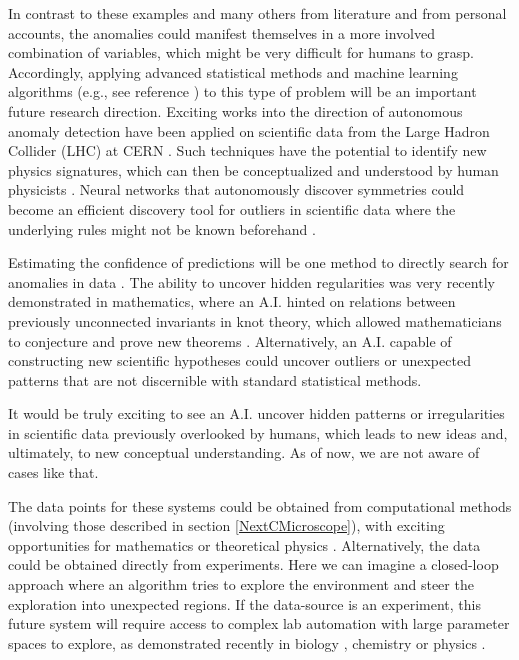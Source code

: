 In contrast to these examples and many others from literature and from personal accounts, the anomalies could manifest themselves in a more involved combination of variables, which might be very difficult for humans to grasp. Accordingly, applying advanced statistical methods and machine learning algorithms (e.g., see reference \cite{malhotra2015long}) to this type of problem will be an important future research direction. Exciting works into the direction of autonomous anomaly detection have been applied on scientific data from the Large Hadron Collider (LHC) at CERN \cite{aad2020dijet, tonon2021probing, park2021quasi}. Such techniques have the potential to identify new physics signatures, which can then be conceptualized and understood by human physicists \cite{schwartz2021modern,kasieczka2021lhc}. Neural networks that autonomously discover symmetries could become an efficient discovery tool for outliers in scientific data where the underlying rules might not be known beforehand \cite{yu2018group,dehmamy2021automatic}.

Estimating the confidence of predictions will be one method to directly search for anomalies in data \cite{nigam2021assigning}. The ability to uncover hidden regularities was very recently demonstrated in mathematics, where an A.I. hinted on relations between previously unconnected invariants in knot theory, which allowed mathematicians to conjecture and prove new theorems \cite{davies2021advancing}. Alternatively, an A.I. capable of constructing new scientific hypotheses could uncover outliers or unexpected patterns that are not discernible with standard statistical methods.

It would be truly exciting to see an A.I. uncover hidden patterns or irregularities in scientific data previously overlooked by humans, which leads to new ideas and, ultimately, to new conceptual understanding. As of now, we are not aware of cases like that.


The data points for these systems could be obtained from computational methods (involving those described in section \ref{NextCMicroscope}), with exciting opportunities for mathematics or theoretical physics \cite{douglas2022machine}. Alternatively, the data could be obtained directly from experiments. Here we can imagine a closed-loop approach where an algorithm tries to explore the environment and steer the exploration into unexpected regions. If the data-source is an experiment, this future system will require access to complex lab automation with large parameter spaces to explore, as demonstrated recently in biology \cite{king2009automation}, chemistry \cite{bedard2018reconfigurable, steiner2019organic, coley2019robotic, burger2020mobile, chatterjee2020automated, grizou2020curious} or physics \cite{moon2020machine,dalgaard2020global}.

